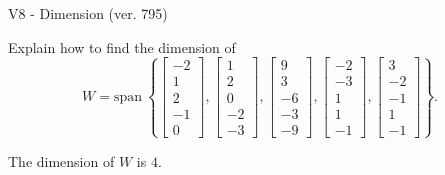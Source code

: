 \begin{exercise}
  \begin{exerciseTitle}V8 - Dimension (ver. 795)\end{exerciseTitle}
  \begin{exerciseStatement}
    Explain how to find the dimension of 
\[W=\mathrm{span}\ \left\{\left[\begin{array}{r}
-2 \\
1 \\
2 \\
-1 \\
0
\end{array}\right] , \left[\begin{array}{r}
1 \\
2 \\
0 \\
-2 \\
-3
\end{array}\right] , \left[\begin{array}{r}
9 \\
3 \\
-6 \\
-3 \\
-9
\end{array}\right] , \left[\begin{array}{r}
-2 \\
-3 \\
1 \\
1 \\
-1
\end{array}\right] , \left[\begin{array}{r}
3 \\
-2 \\
-1 \\
1 \\
-1
\end{array}\right]\right\}.\]



  \end{exerciseStatement}
  \begin{exerciseAnswer}
   The dimension of \(W\) is  \(4\).
  


  \end{exerciseAnswer}
\end{exercise}